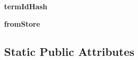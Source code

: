 \begin{DoxyCompactItemize}
\item 
\hypertarget{classcheshire3_1_1result_set_1_1_simple_result_set_a334f703cb52f8eb4754b42f7063b48d2}{{\bfseries term\-Id\-Hash}}\label{classcheshire3_1_1result_set_1_1_simple_result_set_a334f703cb52f8eb4754b42f7063b48d2}

\item 
\hypertarget{classcheshire3_1_1result_set_1_1_simple_result_set_ac63374d476de6f19e1ec456d8b4e14c9}{{\bfseries from\-Store}}\label{classcheshire3_1_1result_set_1_1_simple_result_set_ac63374d476de6f19e1ec456d8b4e14c9}

\end{DoxyCompactItemize}
\subsection*{Static Public Attributes}
